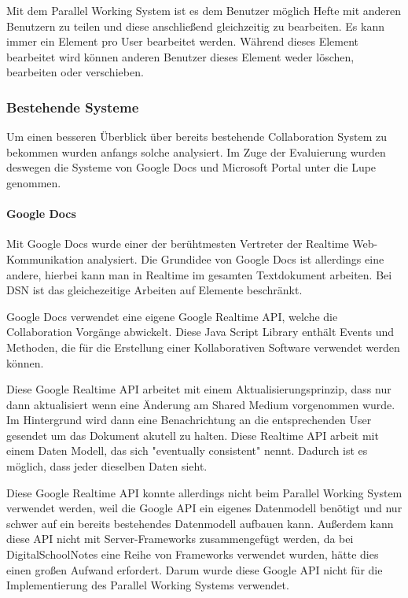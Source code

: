 Mit dem Parallel Working System ist es dem Benutzer möglich Hefte mit anderen Benutzern zu teilen und diese anschließend gleichzeitig zu bearbeiten. Es kann immer ein Element pro User bearbeitet werden. Während dieses Element bearbeitet wird können anderen Benutzer dieses Element weder löschen, bearbeiten oder verschieben. 
\subsubsection{Bestehende Systeme}
Um einen besseren Überblick über bereits bestehende Collaboration System zu bekommen wurden anfangs solche analysiert. Im Zuge der Evaluierung wurden deswegen die Systeme von Google Docs und Microsoft Portal unter die Lupe genommen.
\paragraph{Google Docs}
Mit Google Docs wurde einer der berühtmesten Vertreter der Realtime Web-Kommunikation analysiert. Die Grundidee von Google Docs ist allerdings eine andere, hierbei kann man in Realtime im gesamten Textdokument arbeiten. Bei DSN ist das gleichezeitige Arbeiten auf Elemente beschränkt.

Google Docs verwendet eine eigene Google Realtime API, welche die Collaboration Vorgänge abwickelt. Diese Java Script Library enthält Events und Methoden, die für die Erstellung einer Kollaborativen Software verwendet werden können.

Diese Google Realtime API arbeitet mit einem Aktualisierungsprinzip, dass nur dann aktualisiert wenn eine Änderung am Shared Medium vorgenommen wurde. Im Hintergrund wird dann eine Benachrichtung an die entsprechenden User gesendet um das Dokument akutell zu halten. Diese Realtime API arbeit mit einem Daten Modell, das sich "eventually consistent" nennt. Dadurch ist es möglich, dass jeder dieselben Daten sieht.\cite{GOOGLE}

Diese Google Realtime API konnte allerdings nicht beim Parallel Working System verwendet werden, weil die Google API ein eigenes Datenmodell benötigt und nur schwer auf ein bereits bestehendes Datenmodell aufbauen kann. Außerdem kann diese API nicht mit Server-Frameworks zusammengefügt werden, da bei DigitalSchoolNotes eine Reihe von Frameworks verwendet wurden, hätte dies einen großen Aufwand erfordert. Darum wurde diese Google API nicht für die Implementierung des Parallel Working Systems verwendet.

